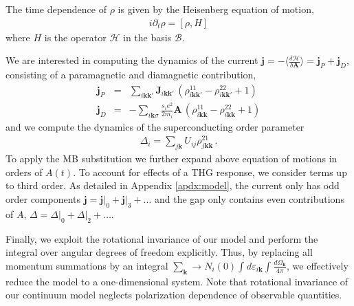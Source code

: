 \documentclass[aps,prb,reprint,noeprint,superscriptaddress]{revtex4-1}
\begin{document}
The time dependence of $\rho$ is given by the Heisenberg equation of motion,
\begin{eqnarray*}
  i\partial_t \rho = \left[ \rho, H \right]
\end{eqnarray*}
where $H$ is the operator $\mathcal{H}$ in the basis $\mathcal{B}$. 

We are interested in computing the dynamics of the current
$ \mathbf{j} = -\big\langle \frac{\delta \mathcal{H}}{\delta
\mathbf{A}}\big\rangle =
\mathbf{j}_P + \mathbf{j}_D$, consisting of a paramagnetic and diamagnetic
contribution,
\begin{eqnarray*}
  \mathbf{j}_P 
	&=&
  	\sum_{i\mathbf{kk'}}^{}
	\mathbf{J}_{i\mathbf{kk'}}\,
	\left( 
	  \rho_{i\mathbf{kk'}}^{11}
	  -\rho_{i\mathbf{kk'}}^{22}
	  +1
	\right)
	\\
  \mathbf{j}_D &=& -\sum_{i\mathbf{k}\sigma}^{} \frac{s_i e^2}{2m_i} 
  \mathbf{A} \,
	\left( 
	  \rho_{i\mathbf{kk}}^{11}
	  -\rho_{i\mathbf{kk}}^{22}
	  +1
	\right)
\end{eqnarray*}
and we compute the dynamics of the superconducting order parameter
\begin{eqnarray*}
  \Delta_i = \sum_{j\mathbf{k}}^{}U_{ij} 
  \rho_{j\mathbf{kk}}^{21} \,.
\end{eqnarray*}
To apply the MB substitution we further expand above equation of motions in
orders of $A(t)$. To account for effects of a THG response, we consider terms up to
third order. As detailed in Appendix \ref{apdx:model}, the current only has odd order
components $\mathbf{j} = \mathbf{j}\big|_0 +\mathbf{j}\big|_3 + \dots$ and the
gap only contains even contributions of $A$, $\Delta = \Delta\big|_0 +
\Delta\big|_2 +\dots$. 

Finally, we exploit the rotational invariance of our model and perform the
integral over angular degrees of freedom explicitly. Thus, by replacing all momentum summations
by an integral 
$\sum_{\mathbf{k}}^{} \rightarrow
N_i(0)\int_{}^{}d\varepsilon_{i\mathbf{k}}\int_{}^{}
\frac{d\Omega_{\mathbf{k}}}{4\pi}$, we effectively reduce the model to a
one-dimensional system. Note that rotational invariance of our continuum model
neglects polarization dependence of observable quantities.
\end{document}
